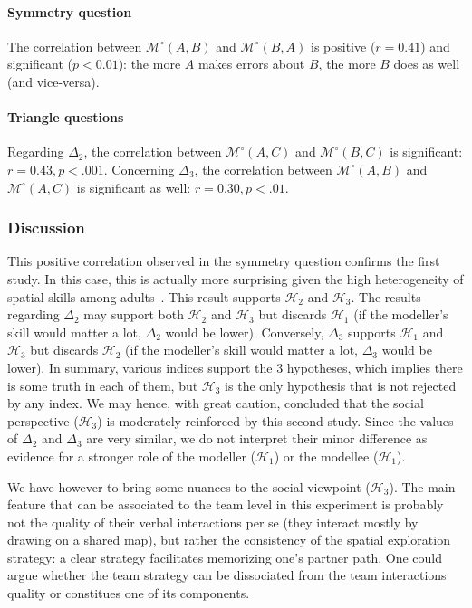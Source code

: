 \documentclass[natbib]{svjour3}
\newcommand{\gModel}[2]{{$\mathcal{M}^{\circ}(#1, #2)$}}
\begin{document}
\paragraph{Symmetry question} The correlation between \gModel{A}{B}  and
\gModel{B}{A}  is positive ($r = 0.41$) and significant ($p < 0.01$): the more $A$
makes errors about $B$, the more $B$ does as well (and vice-versa).

\paragraph{Triangle questions} Regarding $\Delta_2$, the correlation between
\gModel{A}{C} and \gModel{B}{C} is significant: $r=0.43, p <.001$. Concerning
$\Delta_3$, the correlation between \gModel{A}{B} and \gModel{A}{C} is
significant as well: $r=0.30, p <.01$.

\subsubsection*{Discussion}

This positive correlation observed in the symmetry question confirms the first
study.  In this case, this is actually more surprising given  the high
heterogeneity of spatial skills among adults~\citep{liben1981spatial}. This
result supports  $\mathcal{H}_{2}$ and $\mathcal{H}_{3}$. The results regarding
$\Delta_2$ may support both  $\mathcal{H}_{2}$ and  $\mathcal{H}_{3}$  but
discards   $\mathcal{H}_{1}$  (if the modeller's skill would matter a lot,
$\Delta_2$ would be lower). Conversely, $\Delta_3$  supports $\mathcal{H}_{1}$
and  $\mathcal{H}_{3}$ but discards   $\mathcal{H}_{2}$  (if the modeller's
skill would matter a lot,  $\Delta_3$ would be lower). In summary, various
indices support the 3 hypotheses, which implies there is some truth in each of
them, but $\mathcal{H}_{3}$ is the only hypothesis that is not rejected by any
index. We may hence, with great caution, concluded that the social perspective
($\mathcal{H}_{3}$) is moderately reinforced by this second study. Since the
values of $\Delta_2$ and $\Delta_3$ are very similar, we do not interpret their
minor difference as evidence for a stronger role of the modeller
($\mathcal{H}_{1}$) or the modellee ($\mathcal{H}_{1}$).

We have however to bring some nuances to the social viewpoint
($\mathcal{H}_{3}$).  The main feature that can be associated to the team level
in this experiment is probably not the quality of their verbal interactions per
se (they interact mostly by drawing on a shared map), but rather the consistency
of  the spatial exploration strategy: a clear strategy facilitates memorizing
one's partner path.  One could argue whether the team strategy can be
dissociated from the team interactions quality or constitues one of its
components.
\end{document}
